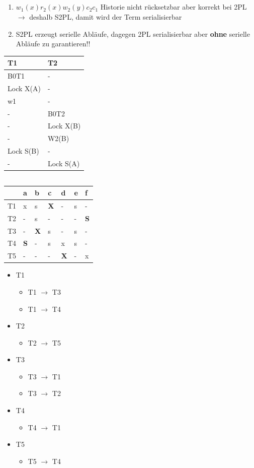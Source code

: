 \subsection{}
\begin{enumerate}
	\item $w_1(x)r_2(x)w_2(y)c_2c_1$ Historie nicht rücksetzbar aber korrekt bei 2PL $\to$ deshalb S2PL, damit wird der Term serialisierbar
	\item S2PL erzeugt serielle Abläufe, dagegen 2PL serialisierbar aber \textbf{ohne} serielle Abläufe zu garantieren!!
\end{enumerate}
\begin{tabularx}{\textwidth}{X|X}
T1 &T2\\
\hline
B0T1&- \\
Lock X(A) &- \\
w1&-\\
\hline
-&B0T2\\
-&Lock X(B)\\
-&W2(B)\\
\hline
Lock S(B) &-\\
-&Lock S(A)
\end{tabularx}

\subsection{}
\begin{tabularx}{\textwidth}{|X|X|X|X|X|X|X|}
\hline
&a &b &c &d &e &f\\
\hline
T1 &x &s &\textbf{X} &- &s &-\\
\hline
T2 &- &s &- &- &- &\textbf{S}\\
\hline
T3 &- &\textbf{X} &s &- &s &-\\
\hline
T4 &\textbf{S} &- &s &x &s &-\\
\hline
T5 &- &- &- &\textbf{X} &- &x\\
\hline
\end{tabularx}
\begin{itemize}
	\item T1
	\begin{itemize}
		\item T1 $\to$ T3
		\item T1 $\to$ T4
	\end{itemize}
	\item T2
	\begin{itemize}
		\item T2 $\to$ T5
	\end{itemize}
	\item T3
	\begin{itemize}
		\item T3 $\to$ T1
		\item T3 $\to$ T2
	\end{itemize}
	\item T4
	\begin{itemize}
		\item T4 $\to$ T1
	\end{itemize}
	\item T5
	\begin{itemize}
		\item T5 $\to$ T4
	\end{itemize}
\end{itemize}